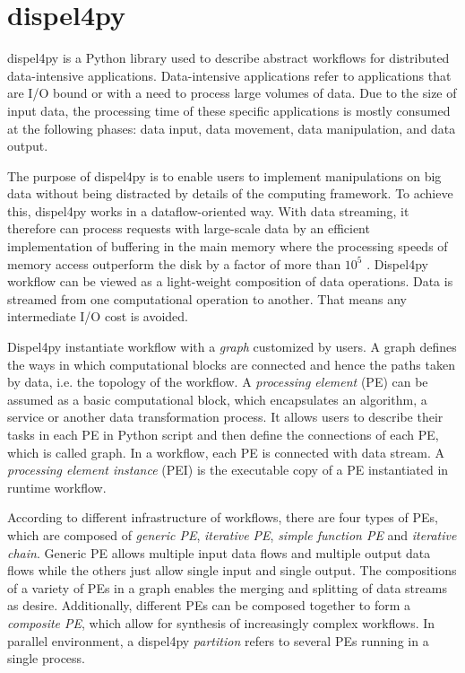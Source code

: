 \documentclass[10pt,twoside,openright,logo]{report}
\begin{document}
\section{dispel4py}
dispel4py\cite{1} is a Python library used to describe abstract workflows for distributed data-intensive applications. Data-intensive applications refer to applications that are I/O bound or with a need to process large volumes of data\cite{3}. Due to the size of input data, the processing time of these specific applications is mostly consumed at the following phases: data input, data movement, data manipulation, and data output.

The purpose of dispel4py is to enable users to implement manipulations on big data without being distracted by details of the computing framework. To achieve this, dispel4py works in a dataflow-oriented way. With data streaming, it therefore can process requests with large-scale data by an efficient implementation of buffering in the main memory where the processing speeds of memory access outperform the disk by a factor of more than $10^5$ \cite{10}. Dispel4py workflow can be viewed as a light-weight composition of data operations. Data is streamed from one computational operation to another. That means any intermediate I/O cost is avoided.

Dispel4py instantiate workflow with a \textit{graph} customized by users. A graph defines the ways in which computational blocks are connected and hence the paths taken by data, i.e. the topology of the workflow. A \textit{processing element} (PE) can be assumed as a basic computational block, which encapsulates an algorithm, a service or another data transformation process. It allows users to describe their tasks in each PE in Python script and then define the connections of each PE, which is called graph. In a workflow, each PE is connected with data stream. A \textit{processing element instance} (PEI) is the executable copy of a PE instantiated in runtime workflow.

According to different infrastructure of workflows, there are four types of PEs, which are composed of \textit{generic PE}, \textit{iterative PE}, \textit{simple function PE} and \textit{iterative chain}. Generic PE allows multiple input data flows and multiple output data flows while the others just allow single input and single output. The compositions of a variety of PEs in a graph enables the merging and splitting of data streams as desire. Additionally, different PEs can be composed together to form a \textit{composite PE}, which allow for synthesis of increasingly complex workflows. In parallel environment, a dispel4py \textit{partition} refers to several PEs running in a single process.
\end{document}
